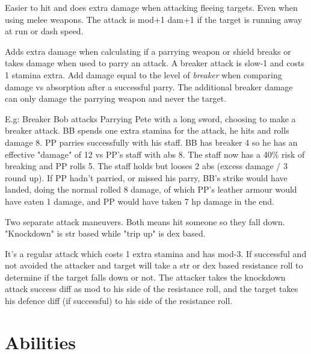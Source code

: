  Easier to hit and does extra damage when attacking fleeing targets. Even when using melee weapons. The attack is mod+1 dam+1 if the target is running away at run or dash speed.


 Adds extra damage when calculating if a parrying weapon or shield breaks or takes damage when used to parry an attack. A breaker attack is slow-1 and costs 1 stamina extra. Add damage equal to the level of \emph{breaker} when comparing damage vs absorption after a successful parry. The additional breaker damage can only damage the parrying weapon and never the target.

E.g: Breaker Bob attacks Parrying Pete with a long sword, choosing to make a breaker attack. BB spends one extra stamina for the attack, he hits and rolls damage 8. PP parries successfully with his staff. BB has breaker 4 so he has an effective "damage" of 12 vs PP's staff with abs 8. The staff now has a 40\% risk of breaking and PP rolls 5. The staff holds but looses 2 abs (excess damage / 3 round up). If PP hadn't parried, or missed his parry, BB's strike would have landed, doing the normal rolled 8 damage, of which PP's leather armour would have eaten 1 damage, and PP would have taken 7 hp damage in the end.


 Two separate attack maneuvers. Both means hit someone so they fall down. "Knockdown" is str based while "trip up" is dex based.

It's a regular attack which costs 1 extra stamina and has mod-3. If successful and not avoided the attacker and target will take a str or dex based resistance roll to determine if the target falls down or not. The attacker takes the knockdown attack success diff as mod to his side of the resistance roll, and the target takes his defence diff (if successful) to his side of the resistance roll.


\closeskillslist















\section*{Abilities}

